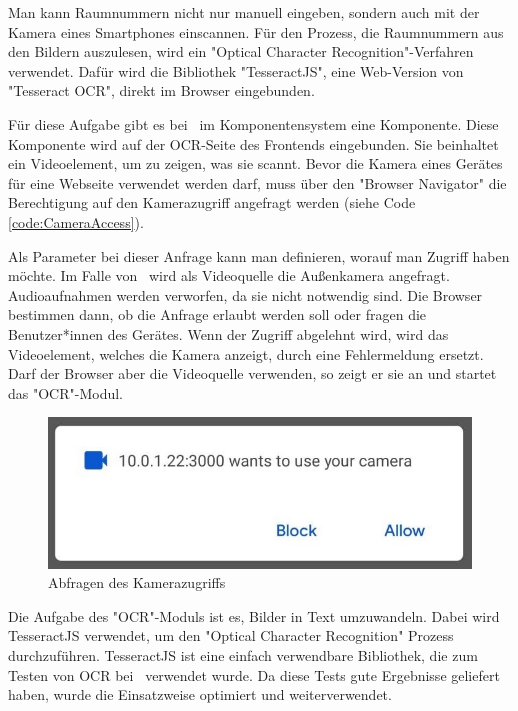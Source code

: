 
\label{sec:ocrmodul}

Man kann Raumnummern nicht nur manuell eingeben, sondern auch mit der Kamera eines Smartphones einscannen. Für den Prozess, die Raumnummern aus den Bildern auszulesen, wird ein "Optical Character Recognition"-Verfahren verwendet. Dafür wird die Bibliothek "TesseractJS", eine Web-Version von "Tesseract OCR", direkt im Browser eingebunden. \cite{TesseractJS} \cite{TesseractJSImplementation}

Für diese Aufgabe gibt es bei \ZELIA\ im Komponentensystem eine Komponente. Diese Komponente wird auf der OCR-Seite des Frontends eingebunden. Sie beinhaltet ein Videoelement, um zu zeigen, was sie scannt. Bevor die Kamera eines Gerätes für eine Webseite verwendet werden darf, muss über den "Browser Navigator" die Berechtigung auf den Kamerazugriff angefragt werden (siehe Code \ref{code:CameraAccess}).


Als Parameter bei dieser Anfrage kann man definieren, worauf man Zugriff haben möchte. Im Falle von \ZELIA\ wird als Videoquelle die Außenkamera angefragt. Audioaufnahmen werden verworfen, da sie nicht notwendig sind. Die Browser bestimmen dann, ob die Anfrage erlaubt werden soll oder fragen die Benutzer*innen des Gerätes. Wenn der Zugriff abgelehnt wird, wird das Videoelement, welches die Kamera anzeigt, durch eine Fehlermeldung ersetzt. Darf der Browser aber die Videoquelle verwenden, so zeigt er sie an und startet das "OCR"-Modul.

\begin{figure}[H]
    \centering
    \includegraphics[width=120mm]{media/OCR/cam_access_light.jpg}
    \caption{Abfragen des Kamerazugriffs}
\end{figure}


Die Aufgabe des "OCR"-Moduls ist es, Bilder in Text umzuwandeln. Dabei wird TesseractJS verwendet, um den "Optical Character Recognition" Prozess durchzuführen. TesseractJS ist eine einfach verwendbare Bibliothek, die zum Testen von OCR bei \ZELIA\ verwendet wurde. Da diese Tests gute Ergebnisse geliefert haben, wurde die Einsatzweise optimiert und weiterverwendet.

